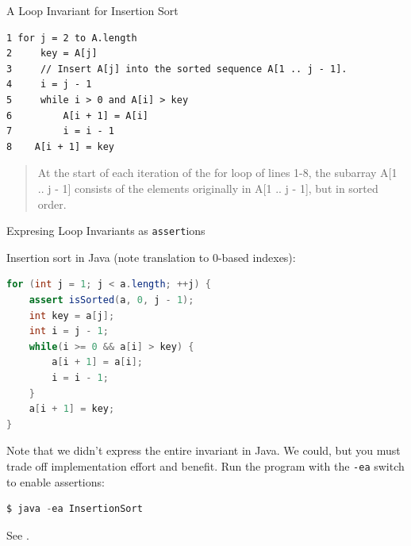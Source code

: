 \documentclass{beamer}
\begin{document}
\begin{frame}[fragile]{A Loop Invariant for Insertion Sort}

\begin{lstlisting}[]
1 for j = 2 to A.length
2     key = A[j]
3     // Insert A[j] into the sorted sequence A[1 .. j - 1].
4     i = j - 1
5     while i > 0 and A[i] > key
6         A[i + 1] = A[i]
7         i = i - 1
8    A[i + 1] = key
\end{lstlisting}

\begin{quote}
At the start of each iteration of the for loop of lines 1-8, the subarray A[1 .. j - 1] consists of the elements originally in A[1 .. j - 1], but in sorted order.
\end{quote}

\end{frame}

\begin{frame}[fragile]{Expresing Loop Invariants as {\tt assert}ions}

Insertion sort in Java (note translation to 0-based indexes):
\begin{lstlisting}[language=Java]
for (int j = 1; j < a.length; ++j) {
    assert isSorted(a, 0, j - 1);
    int key = a[j];
    int i = j - 1;
    while(i >= 0 && a[i] > key) {
        a[i + 1] = a[i];
        i = i - 1;
    }
    a[i + 1] = key;
}
\end{lstlisting}
Note that we didn't express the entire invariant in Java.  We could, but you must trade off implementation effort and benefit. Run the program with the {\tt -ea} switch to enable assertions:
\begin{lstlisting}[language=Java]
$ java -ea InsertionSort
\end{lstlisting}

See .


\end{frame}
\end{document}

